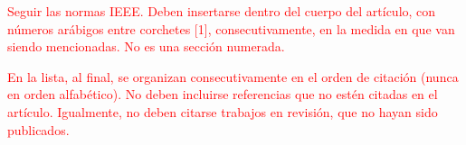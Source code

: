 \documentclass[twocolumn,10pt]{article}
\begin{document}



\textcolor{red}{Seguir las normas IEEE. Deben insertarse dentro del cuerpo del artículo, con números arábigos entre corchetes [1], consecutivamente, en la medida en que van siendo mencionadas. No es una sección numerada.}

\textcolor{red}{
En la lista, al final, se organizan consecutivamente en el orden de citación (nunca en orden alfabético).  No deben incluirse referencias que no estén citadas en el artículo.  Igualmente, no deben citarse trabajos en revisión, que no hayan sido publicados.}

\end{document}
